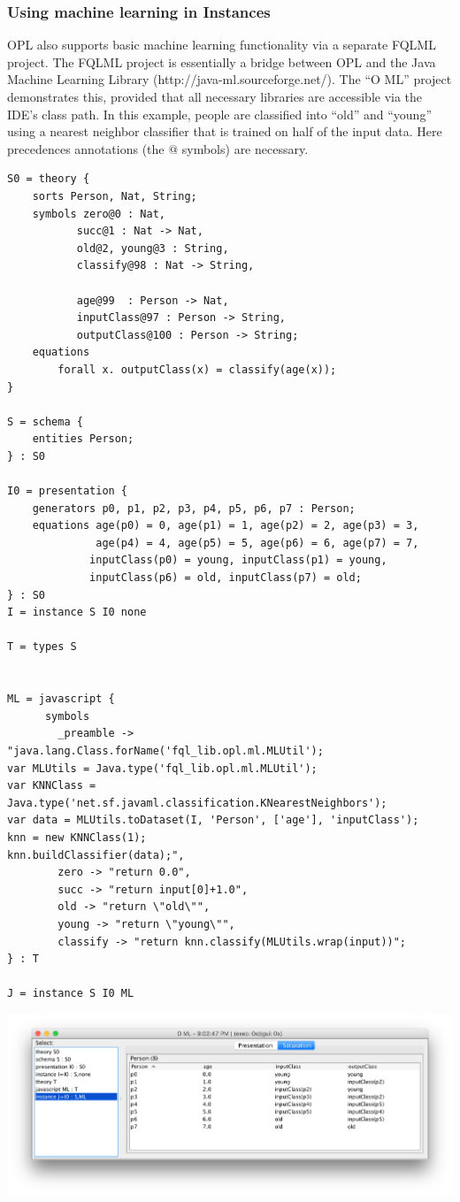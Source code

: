 \documentclass[12pt]{article}
\begin{document}
\subsubsection{Using machine learning in Instances}

OPL also supports basic machine learning functionality via a separate FQLML project.  The FQLML project is essentially a bridge between OPL and the Java Machine Learning Library  ({\sf http://java-ml.sourceforge.net/}).  The ``O ML'' project demonstrates this, provided that all necessary libraries are accessible via the IDE's class path.  In this example, people are classified into ``old'' and ``young'' using a nearest neighbor classifier that is trained on half of the input data.  Here precedences annotations (the $@$ symbols) are necessary.

\begin{verbatim}
S0 = theory {
	sorts Person, Nat, String;
	symbols zero@0 : Nat, 
		   succ@1 : Nat -> Nat,
		   old@2, young@3 : String,		   
		   classify@98 : Nat -> String,
   
		   age@99  : Person -> Nat,
		   inputClass@97 : Person -> String,
		   outputClass@100 : Person -> String;
	equations
		forall x. outputClass(x) = classify(age(x));
}

S = schema {
	entities Person;
} : S0

I0 = presentation {
	generators p0, p1, p2, p3, p4, p5, p6, p7 : Person;
	equations age(p0) = 0, age(p1) = 1, age(p2) = 2, age(p3) = 3, 
	          age(p4) = 4, age(p5) = 5, age(p6) = 6, age(p7) = 7,
		     inputClass(p0) = young, inputClass(p1) = young, 
		     inputClass(p6) = old, inputClass(p7) = old;
} : S0
I = instance S I0 none

T = types S


ML = javascript {
      symbols
		_preamble -> "java.lang.Class.forName('fql_lib.opl.ml.MLUtil'); 
var MLUtils = Java.type('fql_lib.opl.ml.MLUtil'); 
var KNNClass = Java.type('net.sf.javaml.classification.KNearestNeighbors'); 
var data = MLUtils.toDataset(I, 'Person', ['age'], 'inputClass'); 
knn = new KNNClass(1); 
knn.buildClassifier(data);",
		zero -> "return 0.0",
		succ -> "return input[0]+1.0",
		old -> "return \"old\"",
		young -> "return \"young\"",
		classify -> "return knn.classify(MLUtils.wrap(input))";
} : T

J = instance S I0 ML
\end{verbatim}

\begin{center}
\includegraphics[width=6in]{ml}
\end{center}
\end{document}
